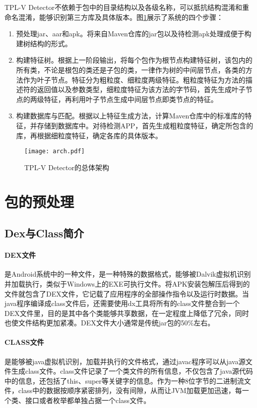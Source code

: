 TPL-V Detector不依赖于包中的目录结构以及各级名称，可以抵抗结构混淆和重命名混淆，能够识别第三方库及具体版本。图\ref{fig:arch}展示了系统的四个步骤：
\begin{enumerate}
\item{预处理jar、aar和apk。将来自Maven仓库的jar包以及待检测apk处理成便于构建树结构的形式。}
\item{构建特征树。根据上一阶段输出，将每个包作为根节点构建特征树，该包内的所有类，不论是根包的类还是子包的类，一律作为树的中间层节点，各类的方法作为叶子节点。特征分为粗粒度、细粒度两级特征。粗粒度特征为方法的描述符的返回值以及参数类型，细粒度特征为该方法的字节码，首先生成叶子节点的两级特征，再利用叶子节点生成中间层节点即类节点的特征。}
\item{构建数据库与匹配。根据以上特征生成方法，计算Maven仓库中的标准库的特征，并存储到数据库中。对待检测APP，首先生成粗粒度特征，确定所包含的库，再根据细粒度特征，确定各库的具体版本。}
\end{enumerate}


\begin{figure}[!htp]
  \centering
  \texttt{[image: arch.pdf]} \\
  \caption{TPL-V Detector的总体架构}
 \label{fig:arch}
\end{figure}


\section{包的预处理}


\subsection{Dex与Class简介}

\paragraph{DEX文件}是Android系统中的一种文件，是一种特殊的数据格式，能够被Dalvik虚拟机识别并加载执行，类似于Windows上的EXE可执行文件。将APK安装包解压后得到的文件就包含了DEX文件，它记载了应用程序的全部操作指令以及运行时数据。当java程序编译成class文件后，还需要使用dx工具将所有的class文件整合到一个DEX文件里，目的是其中各个类能够共享数据，在一定程度上降低了冗余，同时也使文件结构更加紧凑。DEX文件大小通常是传统jar包的50\%左右\cite{10min}。


\paragraph{CLASS文件}是能够被java虚拟机识别，加载并执行的文件格式，通过javac程序可以从java源文件生成class文件。class文件记录了一个类文件的所有信息，不仅包含了java源代码中的信息，还包括了this、super等关键字的信息。作为一种8位字节的二进制流文件，class中的数据按顺序紧密排列，没有间隙，从而让JVM加载更加迅速，每一个类、接口或者枚举都单独占据一个class文件\cite{class}。


